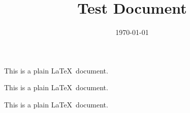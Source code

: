 \documentclass[twocolumn]{article}
\title{Test Document}
\date{\today}
\begin{document}
This is a plain \LaTeX\ document.
\begin{center}
    \begin{minipage}{0.4\textwidth}
        This is a plain \LaTeX\ document.
    \end{minipage}
    \hspace{1pc}
    \begin{minipage}{0.4\textwidth}
        This is a plain \LaTeX\ document.
    \end{minipage}
\end{center}
\end{document}

